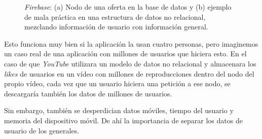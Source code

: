 \begin{figure}[tbp]
\centering
{}
\vspace{3em}
\caption{\textit{Firebase}: (a) Nodo de una oferta en la base de datos y (b) ejemplo de mala práctica en una estructura de datos no relacional, mezclando información de usuario con información general.}
\end{figure}

Esto funciona muy bien si la aplicación la usan cuatro personas, pero imaginemos un caso real de una aplicación con millones de usuarios que hiciera esto. En el caso de que \textit{YouTube} utilizara un modelo de datos no relacional y almacenara los \textit{likes} de usuarios en un vídeo con millones de reproducciones dentro del nodo del propio vídeo, cada vez que un usuario hiciera una petición a ese nodo, se descargaría también los datos de millones de usuarios.

Sin embargo, también se desperdician datos móviles, tiempo del usuario y memoria del dispositivo móvil. De ahí la importancia de separar los datos de usuario de los generales.

